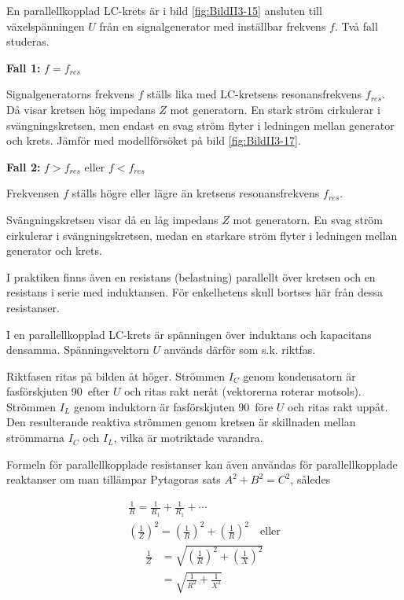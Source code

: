 En parallellkopplad LC-krets är i bild \ref{fig:BildII3-15} ansluten till
växelspänningen \(U\) från en signalgenerator med inställbar frekvens \(f\).
Två fall studeras.

\textbf{Fall 1:} \(f = f_{res}\)

Signalgeneratorns frekvens \(f\) ställs lika med LC-kretsens resonansfrekvens
\(f_{res}\).
Då visar kretsen hög impedans \(Z\) mot generatorn.
En stark ström cirkulerar i svängningskretsen, men endast en svag ström flyter
i ledningen mellan generator och krets.
Jämför med modellförsöket på bild \ref{fig:BildII3-17}.

\textbf{Fall 2:} \(f > f_{res}\) eller \(f < f_{res}\)

Frekvensen \(f\) ställs högre eller lägre än kretsens resonansfrekvens
\(f_{res}\).

Svängningskretsen visar då en låg impedans \(Z\) mot generatorn.
En svag ström cirkulerar i svängningskretsen, medan en starkare ström flyter i
ledningen mellan generator och krets.

I praktiken finns även en resistans (belastning) parallellt över kretsen och en
resistans i serie med induktansen.
För enkelhetens skull bortses här från dessa resistanser.

I en parallellkopplad LC-krets är spänningen över induktans och kapacitans
densamma.
Spänningsvektorn \(U\) används därför som s.k. riktfas.

Riktfasen ritas på bilden åt höger.
Strömmen \(I_C\) genom kondensatorn är fasförskjuten 90\degree~efter \(U\) och
ritas rakt neråt (vektorerna roterar motsols).
Strömmen \(I_L\) genom induktorn är fasförskjuten 90\degree~före \(U\) och
ritas rakt uppåt.
Den resulterande reaktiva strömmen genom kretsen är skillnaden mellan
strömmarna \(I_C\) och \(I_L\), vilka är motriktade varandra.

Formeln för parallellkopplade resistanser kan även användas för
parallellkopplade reaktanser om man tillämpar Pytagoras sats
\(A^2 + B^2 = C^2\), således

\begin{gather*}
  \frac{1}{R} = \frac{1}{R_1} + \frac{1}{R_1} + \cdots \\
  \left(\frac{1}{Z}\right)^2 = \left(\frac{1}{R}\right)^2 +
  \left(\frac{1}{R}\right)^2 \quad \text{eller}
\end{gather*}
\begin{align*}
  \frac{1}{Z} &=
  \sqrt{\left(\frac{1}{R}\right)^2 + \left(\frac{1}{X}\right)^2} \\
  &= \sqrt{\frac{1}{R^2} + \frac{1}{X^2}}
\end{align*}

